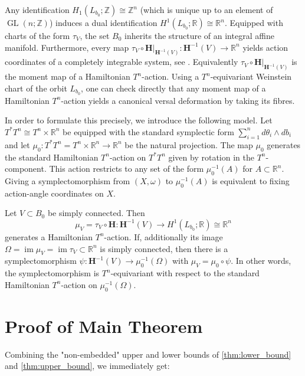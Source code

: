 \documentclass[12pt,a4paper,draft]{scrartcl}
\DeclareMathOperator{\im}{im}
\DeclareMathOperator{\GL}{GL}
\begin{document}
Any identification $H_1(L_{b_0};\mathbb{Z}) \cong \mathbb{Z}^n$ (which is unique up to an element of $\GL(n;ℤ)$) induces a dual identification $H^1(L_{b_0};\mathbb{R}) \cong \mathbb{R}^n$.
Equipped with charts of the form $τ_V$, the set $B_0$ inherits the structure of an integral affine manifold.
Furthermore, every map $τ_V \circ \mathbf{H}\vert_{\mathbf{H}^{-1}(V)} \colon \mathbf{H}^{-1}(V) \rightarrow \mathbb{R}^n$ yields action coordinates of a completely integrable system, see \cite[Lemma 2.15]{evans2021atfs}.
Equivalently $τ_V \circ \mathbf{H}\vert_{\mathbf{H}^{-1}(V)}$ is the moment map of a Hamiltonian $T^n$-action. Using a $T^n$-equivariant Weinstein chart of the orbit $L_{b_0}$, one can check directly that any moment map of a Hamiltonian $T^n$-action yields a canonical versal deformation by taking its fibres.

In order to formulate this precisely, we introduce the following model. Let $T^*T^n \cong T^n \times \mathbb{R}^n$ be equipped with the standard symplectic form $\sum_{i=1}^n d\theta_i \wedge db_i$ and let $\mu_0 \colon T^*T^n = T^n \times \mathbb{R}^n \rightarrow \mathbb{R}^n$ be the natural projection. The map $\mu_0$ generates the standard Hamiltonian $T^n$-action on $T^*T^n$ given by rotation in the $T^n$-component. This action restricts to any set of the form $\mu_0^{-1}(A)$ for $A \subset \mathbb{R}^n$. Giving a symplectomorphism from $(X,\omega)$ to $\mu_0^{-1}(A)$ is equivalent to fixing action-angle coordinates on $X$. 

\begin{proposition}
    \label{thm:flux_moment_map}
    Let $V \subset B_0$ be simply connected. Then 
    \[
        \mu_V = τ_V \circ \mathbf{H} \colon \mathbf{H}^{-1}(V) \rightarrow H^1(L_{b_0};\mathbb{R}) \cong \mathbb{R}^n
    \]
    generates a Hamiltonian $T^n$-action. If, additionally its image $\Omega = \im \mu_V = \im τ_V \subset \mathbb{R}^n$ is simply connected, then there is a symplectomorphism $\psi \colon \mathbf{H}^{-1}(V) \rightarrow \mu_0^{-1}(\Omega)$ with $\mu_V = \mu_0 \circ \psi$. In other words, the symplectomorphism is $T^n$-equivariant with respect to the standard Hamiltonian $T^n$-action on $\mu_0^{-1}(\Omega)$.
\end{proposition}

\section{Proof of Main Theorem}

Combining the "non-embedded" upper and lower bounds of \cref{thm:lower_bound} and \cref{thm:upper_bound}, we immediately get:
\end{document}
